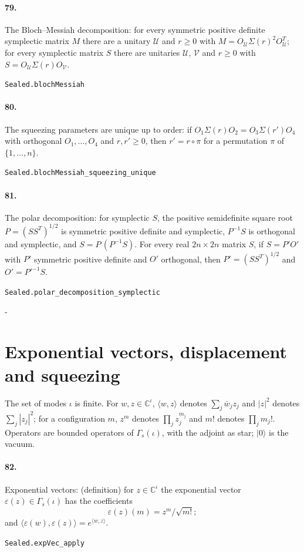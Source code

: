 \documentclass[11pt]{article}
\makeatletter
\newcommand{\keepspace}[1]{\par\penalty-100\begingroup\setlength{\dimen@}{#1}\dimen@ii\pagegoal\advance\dimen@ii-\pagetotal\ifdim\dimen@>\dimen@ii\ifdim\dimen@ii>\z@\vfil\fi\break\fi\endgroup}
\makeatother
\begin{document}
\paragraph{79.} The Bloch–Messiah decomposition: for every symmetric positive definite symplectic matrix $M$ there are a unitary $\mathcal U$ and $r \ge 0$ with $M = O_{\mathcal U} \Sigma(r)^2 O_{\mathcal U}^T$; for every symplectic matrix $S$ there are unitaries $\mathcal U$, $\mathcal V$ and $r \ge 0$ with $S = O_{\mathcal U} \Sigma(r) O_{\mathcal V}$.\par{\footnotesize\texttt{Sealed.blochMessiah}}

\paragraph{80.} The squeezing parameters are unique up to order: if $O_1 \Sigma(r) O_2 = O_3 \Sigma(r') O_4$ with orthogonal $O_1, \dots, O_4$ and $r, r' \ge 0$, then $r' = r \circ \pi$ for a permutation $\pi$ of $\{1, \dots, n\}$.\par{\footnotesize\texttt{Sealed.blochMessiah\_squeezing\_unique}}

\paragraph{81.} The polar decomposition: for symplectic $S$, the positive semidefinite square root $P = (S S^T)^{1/2}$ is symmetric positive definite and symplectic, $P^{-1} S$ is orthogonal and symplectic, and $S = P\, (P^{-1} S)$. For every real $2n \times 2n$ matrix $S$, if $S = P' O'$ with $P'$ symmetric positive definite and $O'$ orthogonal, then $P' = (S S^T)^{1/2}$ and $O' = P'^{-1} S$.\par{\footnotesize\texttt{Sealed.polar\_decomposition\_symplectic}}

\keepspace{14\baselineskip}\section*{Exponential vectors, displacement and squeezing}
The set of modes $\iota$ is finite. For $w, z \in \mathbb C^\iota$, $\langle w, z\rangle$ denotes $\sum_j \bar w_j z_j$ and $|z|^2$ denotes $\sum_j |z_j|^2$; for a configuration $m$, $z^m$ denotes $\prod_j z_j^{m_j}$ and $m!$ denotes $\prod_j m_j!$. Operators are bounded operators of $\Gamma_s(\iota)$, with the adjoint as star; $|0\rangle$ is the vacuum.

\paragraph{82.} Exponential vectors: (definition) for $z \in \mathbb C^\iota$ the exponential vector $\varepsilon(z) \in \Gamma_s(\iota)$ has the coefficients \[\varepsilon(z)(m) = z^m/\sqrt{m!};\] and $\langle \varepsilon(w), \varepsilon(z)\rangle = e^{\langle w, z\rangle}$.\par{\footnotesize\texttt{Sealed.expVec\_apply}}
\end{document}
